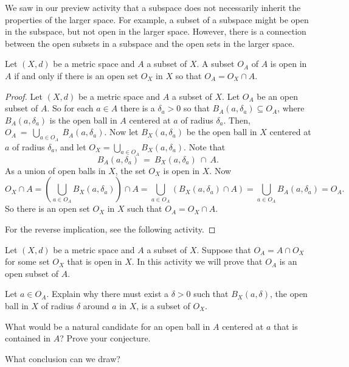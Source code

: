 
We saw in our preview activity that a subspace does not necessarily inherit the properties of the larger space. For example, a subset of a subspace might be open in the subspace, but not open in the larger space. However, there is a connection between the open subsets in a subspace and the open sets in the larger space. 

\begin{theorem} \label{thm:relatively_open_ms} Let $(X,d)$ be a metric space and $A$ a subset of $X$. A subset $O_A$ of $A$ is open in $A$ if and only if there is an open set $O_X$ in $X$ so that $O_A = O_X \cap A$. 
\end{theorem}

\begin{proof} Let $(X,d)$ be a metric space and $A$ a subset of $X$. Let $O_A$ be an open subset of $A$. So for each $a \in A$ there is a $\delta_a > 0$ so that $B_A(a, \delta_a) \subseteq O_A$, where $B_A(a, \delta_a)$ is the open ball in $A$ centered at $a$ of radius $\delta_a$. Then, $O_A~=~\bigcup_{a \in O_A}~B_A(a, \delta_a)$. Now let $B_X(a, \delta_a)$ be the open ball in $X$ centered at $a$ of radius $\delta_a$, and let $O_X = \bigcup_{a \in O_A} B_X(a, \delta_a)$. Note that \[B_A(a, \delta_a)~=~B_X(a, \delta_a)~\cap~A.\]
As a union of open balls in $X$, the set $O_X$ is open in $X$. Now
\[O_X \cap A = \left(\bigcup_{a \in O_A} B_X(a, \delta_a) \right) \cap A = \bigcup_{a \in O_A} \left( B_X(a, \delta_a) \cap A \right) = \bigcup_{a \in O_A} B_A(a, \delta_a) = O_A.\]
So there is an open set $O_X$ in $X$ such that $O_A = O_X \cap A$. 

For the reverse implication, see the following activity. 
\end{proof}


\begin{activity} Let $(X,d)$ be a metric space and $A$ a subset of $X$. Suppose that $O_A = A \cap O_X$ for some set $O_X$ that is open in $X$. In this activity we will prove that $O_A$ is an open subset of $A$. 
\ba
\item Let $a \in O_A$. Explain why there must exist a $\delta > 0$ such that $B_X(a, \delta)$, the open ball in $X$ of radius $\delta$ around $a$ in $X$, is a subset of $O_X$. 

\item What would be a natural candidate for an open ball in $A$ centered at $a$ that is contained in $A$? Prove your conjecture.

\item What conclusion can we draw?

\ea

\end{activity} 

